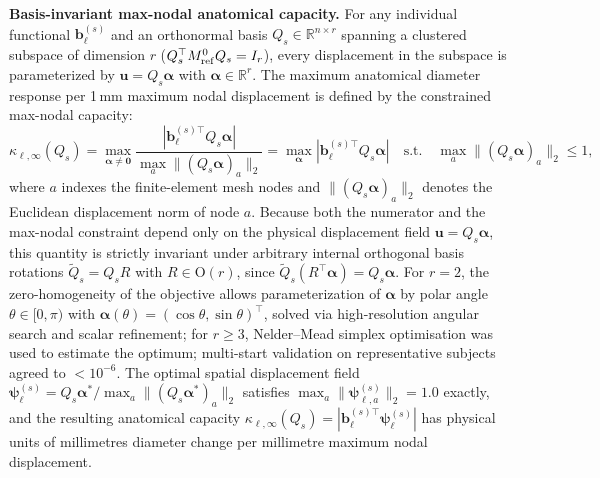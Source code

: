\documentclass[11pt]{article}
\begin{document}
\noindent\textbf{Basis-invariant max-nodal anatomical capacity.}
For any individual functional $\mathbf b_\ell^{(s)}$ and an orthonormal basis $Q_s \in \mathbb R^{n \times r}$ spanning a clustered subspace of dimension $r$ ($Q_s^\top M_{\rm ref}^0 Q_s = I_r$), every displacement in the subspace is parameterized by $\mathbf u = Q_s \boldsymbol\alpha$ with $\boldsymbol\alpha \in \mathbb R^r$.
The maximum anatomical diameter response per 1\,mm maximum nodal displacement is defined by the constrained max-nodal capacity:
\begin{equation}
\kappa_{\ell,\infty}(Q_s) = \max_{\boldsymbol\alpha \ne \mathbf 0} \frac{|\mathbf b_\ell^{(s)\top} Q_s \boldsymbol\alpha|}{\max_a \|(Q_s \boldsymbol\alpha)_a\|_2} = \max_{\boldsymbol\alpha} |\mathbf b_\ell^{(s)\top} Q_s \boldsymbol\alpha| \quad \text{s.t.} \quad \max_a \|(Q_s \boldsymbol\alpha)_a\|_2 \le 1,
\label{eq:single-functional-max-nodal}
\end{equation}
where $a$ indexes the finite-element mesh nodes and $\|(Q_s \boldsymbol\alpha)_a\|_2$ denotes the Euclidean displacement norm of node $a$.
Because both the numerator and the max-nodal constraint depend only on the physical displacement field $\mathbf u = Q_s \boldsymbol\alpha$, this quantity is strictly invariant under arbitrary internal orthogonal basis rotations $\widetilde Q_s = Q_s R$ with $R \in \mathrm O(r)$, since $\widetilde Q_s (R^\top \boldsymbol\alpha) = Q_s \boldsymbol\alpha$.
For $r=2$, the zero-homogeneity of the objective allows parameterization of $\boldsymbol\alpha$ by polar angle $\theta \in [0, \pi)$ with $\boldsymbol\alpha(\theta) = (\cos\theta, \sin\theta)^\top$, solved via high-resolution angular search and scalar refinement; for $r \ge 3$, Nelder--Mead simplex optimisation was used to estimate the optimum; multi-start validation on representative subjects agreed to $<10^{-6}$.
The optimal spatial displacement field $\boldsymbol\psi_\ell^{(s)} = Q_s \boldsymbol\alpha^* / \max_a \|(Q_s \boldsymbol\alpha^*)_a\|_2$ satisfies $\max_a \|\boldsymbol\psi_{\ell,a}^{(s)}\|_2 = 1.0$ exactly, and the resulting anatomical capacity $\kappa_{\ell,\infty}(Q_s) = |\mathbf b_\ell^{(s)\top}\boldsymbol\psi_\ell^{(s)}|$ has physical units of millimetres diameter change per millimetre maximum nodal displacement.
\end{document}
